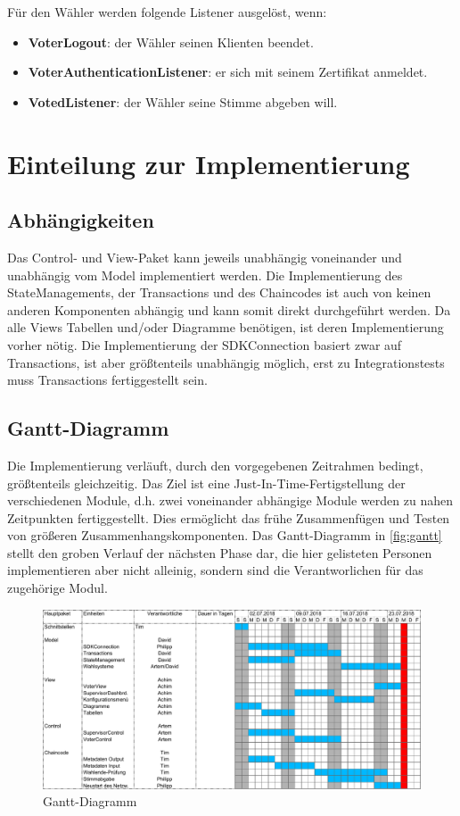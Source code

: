 \documentclass[parskip=full]{scrartcl}
\newcommand{\fakeparagraph}[1]{\textbf{#1}}
\begin{document}
	Für den Wähler werden folgende Listener ausgelöst, wenn:
	\begin{itemize}
		\item\fakeparagraph{VoterLogout}: der Wähler seinen Klienten beendet.
		\item\fakeparagraph{VoterAuthenticationListener}: er sich mit seinem Zertifikat anmeldet.
		\item\fakeparagraph{VotedListener}: der Wähler seine Stimme abgeben will.
	\end{itemize}
  
  	\section{Einteilung zur Implementierung}
  	\subsection{Abhängigkeiten}
  	Das Control- und View-Paket kann jeweils unabhängig voneinander und unabhängig vom Model implementiert werden. Die Implementierung des StateManagements, der Transactions und des Chaincodes ist auch von keinen anderen Komponenten abhängig und kann somit direkt durchgeführt werden. Da alle Views Tabellen und/oder Diagramme benötigen, ist deren Implementierung vorher nötig. Die Implementierung der SDKConnection basiert zwar auf Transactions, ist aber größtenteils unabhängig möglich, erst zu Integrationstests muss Transactions fertiggestellt sein.
  	
	\subsection{Gantt-Diagramm}
	Die Implementierung verläuft, durch den vorgegebenen Zeitrahmen bedingt, größtenteils gleichzeitig. Das Ziel ist eine Just-In-Time-Fertigstellung der verschiedenen Module, d.h. zwei voneinander abhängige Module werden zu nahen Zeitpunkten fertiggestellt. Dies ermöglicht das frühe Zusammenfügen und Testen von größeren Zusammenhangskomponenten. Das Gantt-Diagramm in \autoref{fig:gantt} stellt den groben Verlauf der nächsten Phase dar, die hier gelisteten Personen implementieren aber nicht alleinig, sondern sind die Verantworlichen für das zugehörige Modul.
	\begin{figure}[!h]
		\centering
		\includegraphics[width=\textwidth]{pictures/Gantt.pdf}
		\caption{Gantt-Diagramm}
		\label{fig:gantt}
	\end{figure}
\end{document}
